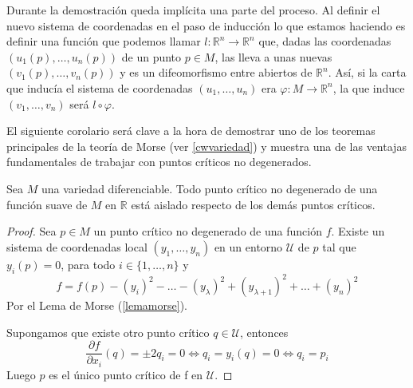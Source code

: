 \bigskip

\begin{remark}
    Durante la demostración queda implícita una parte del proceso. Al definir el nuevo sistema de coordenadas en el paso de inducción lo que estamos haciendo es definir una función que podemos llamar $l:\mathbb{R}^n \to \mathbb{R}^n$ que, dadas las coordenadas $(u_1(p),\dots, u_n(p))$ de un punto $p\in M$, las lleva a unas nuevas $(v_1(p),\dots, v_n(p))$ y es un difeomorfismo entre abiertos de $\mathbb{R}^n$. Así, si la carta que inducía el sistema de coordenadas $(u_1,\dots, u_n)$ era $\varphi : M \to \mathbb{R}^n$, la que induce $(v_1,\dots, v_n)$ será $l\circ \varphi$.
\end{remark}
\bigskip

El siguiente corolario será clave a la hora de demostrar uno de los teoremas principales de la teoría de Morse (ver \ref{cwvariedad}) y muestra una de las ventajas fundamentales de trabajar con puntos críticos no degenerados.
\bigskip
\begin{corollary}
        Sea $M$ una variedad diferenciable. Todo punto crítico no degenerado de una función suave de $M$ en $\mathbb{R}$ está aislado respecto de los demás puntos críticos.
\end{corollary}
\begin{proof}
    Sea $p\in M$ un punto crítico no degenerado de una función $f$. Existe un sistema de coordenadas local $(y_1,\dots, y_n)$ en un entorno $\mathcal{U}$ de $p$ tal que $y_i(p)=0$, para todo $i\in\{1,\dots,n\}$ y 
    \begin{equation*}
        f=f(p)-(y_i)^2-\dots-(y_\lambda)^2 + (y_{\lambda +1})^2+\dots + (y_n)^2
    \end{equation*}
    Por el Lema de Morse (\ref{lemamorse}).

    Supongamos que existe otro punto crítico $q\in\mathcal{U}$, entonces
    \begin{equation*}
        \frac{\partial f}{\partial x_i}(q)=\pm 2q_i= 0\iff q_i= y_i(q)=0\iff q_i=p_i
    \end{equation*}
    Luego $p$ es el único punto crítico de f en $\mathcal{U}$.
    
\end{proof}
\bigskip

